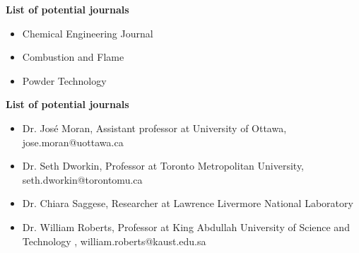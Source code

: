 \textbf{\large{List of potential journals}}
\vspace{0.3cm}
\begin{itemize}
	\item Chemical Engineering Journal
	\item Combustion and Flame
	\item Powder Technology
\end{itemize}

\vspace{1cm}
\textbf{\large{List of potential journals}}
\vspace{0.3cm}

\begin{itemize}
	\item Dr. José Moran, Assistant professor at University of Ottawa, jose.moran@uottawa.ca
	\item Dr. Seth Dworkin, Professor at Toronto Metropolitan University, seth.dworkin@torontomu.ca
	\item Dr. Chiara Saggese, Researcher at Lawrence Livermore National Laboratory
	\item Dr. William Roberts, Professor at King Abdullah University of Science and Technology  , william.roberts@kaust.edu.sa
\end{itemize}